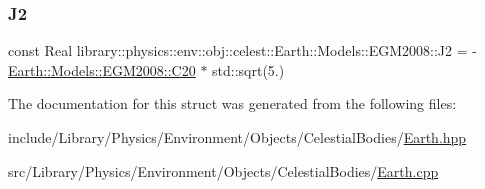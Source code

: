 \subsubsection{\texorpdfstring{J2}{J2}}
{\footnotesize\ttfamily const Real library\+::physics\+::env\+::obj\+::celest\+::\+Earth\+::\+Models\+::\+E\+G\+M2008\+::\+J2 = -\/\hyperlink{structlibrary_1_1physics_1_1env_1_1obj_1_1celest_1_1_earth_1_1_models_1_1_e_g_m2008_a70cf03c48fda3badebf10588c83e183d}{Earth\+::\+Models\+::\+E\+G\+M2008\+::\+C20} $\ast$ std\+::sqrt(5.)\hspace{0.3cm}{\ttfamily [static]}}



The documentation for this struct was generated from the following files\+:\begin{DoxyCompactItemize}
\item 
include/\+Library/\+Physics/\+Environment/\+Objects/\+Celestial\+Bodies/\hyperlink{_objects_2_celestial_bodies_2_earth_8hpp}{Earth.\+hpp}\item 
src/\+Library/\+Physics/\+Environment/\+Objects/\+Celestial\+Bodies/\hyperlink{_objects_2_celestial_bodies_2_earth_8cpp}{Earth.\+cpp}\end{DoxyCompactItemize}
